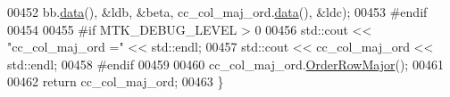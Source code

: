 \begin{DoxyCode}
00452          bb.\hyperlink{classmtk_1_1DenseMatrix_a16b3ff56feb2658b9fc7147d1de4d8e7}{data}(), &ldb, &beta, cc\_col\_maj\_ord.\hyperlink{classmtk_1_1DenseMatrix_a16b3ff56feb2658b9fc7147d1de4d8e7}{data}(), &ldc);
00453 \textcolor{preprocessor}{  #endif}
00454 
00455 \textcolor{preprocessor}{  #if MTK\_DEBUG\_LEVEL > 0}
00456   std::cout << \textcolor{stringliteral}{"cc\_col\_maj\_ord ="} << std::endl;
00457   std::cout << cc\_col\_maj\_ord << std::endl;
00458 \textcolor{preprocessor}{  #endif}
00459 
00460   cc\_col\_maj\_ord.\hyperlink{classmtk_1_1DenseMatrix_ac2949efba3e8278335d45418c85433e4}{OrderRowMajor}();
00461 
00462   \textcolor{keywordflow}{return} cc\_col\_maj\_ord;
00463 \}
\end{DoxyCode}
